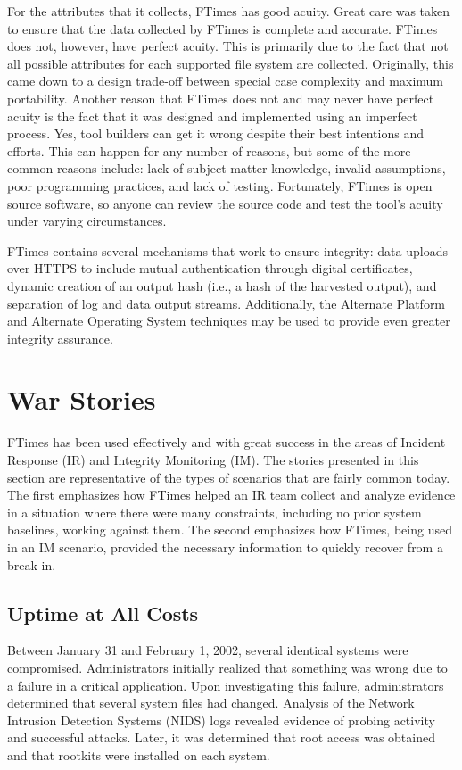 \documentclass[10pt]{article}
\begin{document}
For the attributes that it collects, FTimes has good acuity.  Great
care was taken to ensure that the data collected by FTimes is complete
and accurate.  FTimes does not, however, have perfect acuity.  This is
primarily due to the fact that not all possible attributes for each
supported file system are collected.  Originally, this came down to a
design trade-off between special case complexity and maximum
portability.  Another reason that FTimes does not and may never have
perfect acuity is the fact that it was designed and implemented using
an imperfect process.  Yes, tool builders can get it wrong despite
their best intentions and efforts.  This can happen for any number of
reasons, but some of the more common reasons include: lack of subject
matter knowledge, invalid assumptions, poor programming practices, and
lack of testing.  Fortunately, FTimes is open source software, so
anyone can review the source code and test the tool's acuity under
varying circumstances.

FTimes contains several mechanisms that work to ensure integrity: data
uploads over HTTPS to include mutual authentication through digital
certificates, dynamic creation of an output hash (i.e., a hash of the
harvested output), and separation of log and data output streams.
Additionally, the Alternate Platform and Alternate Operating System
techniques may be used to provide even greater integrity assurance.

\section{War Stories}

FTimes has been used effectively and with great success in the areas
of Incident Response (IR) and Integrity Monitoring (IM).  The stories
presented in this section are representative of the types of scenarios
that are fairly common today.  The first emphasizes how FTimes helped
an IR team collect and analyze evidence in a situation where there
were many constraints, including no prior system baselines, working
against them.  The second emphasizes how FTimes, being used in an IM
scenario, provided the necessary information to quickly recover from a
break-in.

\subsection{Uptime at All Costs}

Between January 31 and February 1, 2002, several identical systems
were compromised.  Administrators initially realized that something
was wrong due to a failure in a critical application.  Upon
investigating this failure, administrators determined that several
system files had changed.  Analysis of the Network Intrusion Detection
Systems (NIDS) logs revealed evidence of probing activity and
successful attacks.  Later, it was determined that root access was
obtained and that rootkits were installed on each system.
\end{document}
